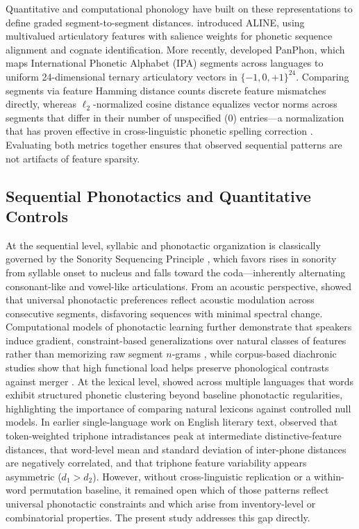 \documentclass[cm]{glossa}
\begin{document}
Quantitative and computational phonology have built on these representations to define graded segment-to-segment distances. \citet{kondrak2003} introduced ALINE, using multivalued articulatory features with salience weights for phonetic sequence alignment and cognate identification. More recently, \citet{mortensen2016panphon} developed PanPhon, which maps International Phonetic Alphabet (IPA) segments across languages to uniform 24-dimensional ternary articulatory vectors in $\{-1, 0, +1\}^{24}$. Comparing segments via feature Hamming distance counts discrete feature mismatches directly, whereas $\ell_2$-normalized cosine distance equalizes vector norms across segments that differ in their number of unspecified ($0$) entries---a normalization that has proven effective in cross-linguistic phonetic spelling correction \citep{mortensen2016panphon}. Evaluating both metrics together ensures that observed sequential patterns are not artifacts of feature sparsity.

\subsection{Sequential Phonotactics and Quantitative Controls}
At the sequential level, syllabic and phonotactic organization is classically governed by the Sonority Sequencing Principle \citep{clements1990}, which favors rises in sonority from syllable onset to nucleus and falls toward the coda---inherently alternating consonant-like and vowel-like articulations. From an acoustic perspective, \citet{kawasakifukumori1992} showed that universal phonotactic preferences reflect acoustic modulation across consecutive segments, disfavoring sequences with minimal spectral change. Computational models of phonotactic learning further demonstrate that speakers induce gradient, constraint-based generalizations over natural classes of features rather than memorizing raw segment $n$-grams \citep{hayes2008}, while corpus-based diachronic studies show that high functional load helps preserve phonological contrasts against merger \citep{wedel2013}. At the lexical level, \citet{dautriche2017} showed across multiple languages that words exhibit structured phonetic clustering beyond baseline phonotactic regularities, highlighting the importance of comparing natural lexicons against controlled null models. In earlier single-language work on English literary text, \citet{araujo2013thesis} observed that token-weighted triphone intradistances peak at intermediate distinctive-feature distances, that word-level mean and standard deviation of inter-phone distances are negatively correlated, and that triphone feature variability appears asymmetric ($d_1 > d_2$). However, without cross-linguistic replication or a within-word permutation baseline, it remained open which of those patterns reflect universal phonotactic constraints and which arise from inventory-level or combinatorial properties. The present study addresses this gap directly.
\end{document}
